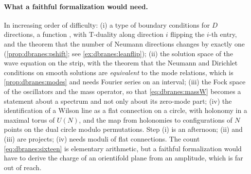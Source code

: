 \paragraph{What a faithful formalization would need.} In increasing order of difficulty: (i) a
type of boundary conditions for $D$ directions, a function , with T-duality
along direction $i$ flipping the $i$-th entry, and the theorem that the number of Neumann
directions changes by exactly one (\cref{prop:dbranes:pshift}; see \cref{ex:dbranes:leanflip});
(ii) the solution space of the wave equation on the strip, with the theorem that the Neumann
and Dirichlet conditions on smooth solutions are \emph{equivalent} to the mode relations, which
is \cref{prop:dbranes:modes} and needs Fourier series on an interval; (iii) the Fock space of the
oscillators and the mass operator, so that \eqref{eq:dbranes:massW} becomes a statement about a
spectrum and not only about its zero-mode part; (iv) the identification of a Wilson line as a
flat connection on a circle, with holonomy in a maximal torus of $U(N)$, and the map from
holonomies to configurations of $N$ points on the dual circle modulo permutations. Step (i) is
an afternoon; (ii) and (iii) are projects; (iv) needs moduli of flat connections. The count
\eqref{eq:dbranes:sixteen} is elementary arithmetic, but a faithful formalization would have to
derive the charge of an orientifold plane from an amplitude, which is far out of reach.

